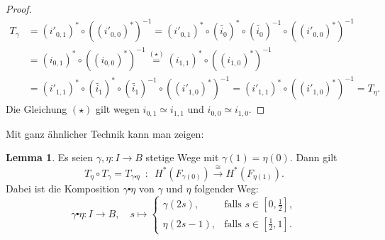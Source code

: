 \documentclass[11pt, a4paper, german]{article}
\theoremstyle{definition}
\newtheorem{lem}{Lemma}
\theoremstyle{remark}
\begin{document}
\begin{proof}
\begin{align*}
    T_\gamma &
    = (i'_{0,1})^* \circ ((i'_{0,0})^*)^{-1}
    = (i'_{0,1})^* \circ (\widetilde{i_0})^* \circ (\widetilde{i_0})^{-1} \circ ((i'_{0,0})^*)^{-1} \\
    & = (i_{0,1})^* \circ ((i_{0,0})^*)^{-1}
    \stackrel{(\star)}{=} (i_{1,1})^* \circ ((i_{1,0})^*)^{-1} \\
    & = (i'_{1,1})^* \circ (\widetilde{i_1})^* \circ (\widetilde{i_1})^{-1} \circ ((i'_{1,0})^*)^{-1}
    = (i'_{1,1})^* \circ ((i'_{1,0})^*)^{-1}
    = T_\eta.
  \end{align*}
  Die Gleichung $(\star)$ gilt wegen $i_{0,1} \simeq i_{1,1}$ und $i_{0,0} \simeq i_{1,0}$.
\end{proof}

Mit ganz ähnlicher Technik kann man zeigen:

\begin{lem}
  Es seien $\gamma, \eta : I \to B$ stetige Wege mit $\gamma(1) = \eta(0)$.
  Dann gilt
  \[ T_\eta \circ T_\gamma = T_{\gamma \centerdot \eta} \enspace:\enspace H^*(F_{\gamma(0)}) \xrightarrow{\cong} H^*(F_{\eta(1)}). \]
  Dabei ist die Komposition $\gamma \centerdot \eta$ von $\gamma$ und $\eta$ folgender Weg:
  \[
    \gamma \centerdot \eta : I \to B, \quad
    s \mapsto \begin{cases}
      \gamma(2s), & \text{falls } s \in [0, \tfrac{1}{2}], \\
      \eta(2s - 1), & \text{falls } s \in [\tfrac{1}{2}, 1].
    \end{cases}
  \]
\end{lem}
\end{document}
